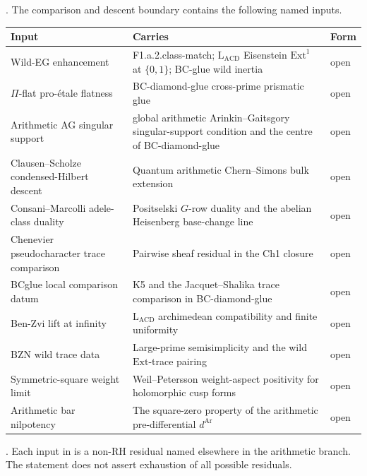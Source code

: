 \begin{definition}
\label{v4-arith:w10-final:def:prior-table}
\ClaimStatusDefinitional. The comparison and descent boundary contains
the following named inputs.
\begin{center}
\small
\begin{tabular}{p{3.6cm}p{7.8cm}p{1.4cm}}
\toprule
\textbf{Input} & \textbf{Carries} & \textbf{Form}\\
\midrule
Wild-EG enhancement &
F1.a.2.class-match;
\(\mathrm{L}_{\mathrm{ACD}}\) Eisenstein \(\mathrm{Ext}^{1}\) at
\(\{0,1\}\); BC-glue wild inertia &
\(\mathrm{open}\)\\
\(\Pi\)-flat pro-\'etale flatness &
BC-diamond-glue cross-prime prismatic glue &
\(\mathrm{open}\)\\
Arithmetic AG singular support &
global arithmetic Arinkin--Gaitsgory singular-support condition and
the centre of BC-diamond-glue &
\(\mathrm{open}\)\\
Clausen--Scholze condensed-Hilbert descent &
Quantum arithmetic Chern--Simons bulk extension &
\(\mathrm{open}\)\\
Consani--Marcolli adele-class duality &
Positselski \(G\)-row duality and the abelian Heisenberg base-change
line &
\(\mathrm{open}\)\\
Chenevier pseudocharacter trace comparison &
Pairwise sheaf residual in the Ch1 closure &
\(\mathrm{open}\)\\
BCglue local comparison datum &
K5 and the Jacquet--Shalika trace comparison in BC-diamond-glue &
\(\mathrm{open}\)\\
Ben-Zvi lift at infinity &
\(\mathrm{L}_{\mathrm{ACD}}\) archimedean compatibility and finite
uniformity &
\(\mathrm{open}\)\\
BZN wild trace data &
Large-prime semisimplicity and the wild \(\mathrm{Ext}\)-trace pairing &
\(\mathrm{open}\)\\
Symmetric-square weight limit &
Weil--Petersson weight-aspect positivity for holomorphic cusp forms &
\(\mathrm{open}\)\\
Arithmetic bar nilpotency &
The square-zero property of the arithmetic pre-differential
\(d^{\mathrm{Ar}}\) &
\(\mathrm{open}\)\\
\bottomrule
\end{tabular}
\end{center}
\end{definition}

\begin{theorem}
\label{v4-arith:w10-final:thm:four-prior}
\ClaimStatusProvedHere. Each input in
 is a non-RH residual named
elsewhere in the arithmetic branch. The statement does not assert
exhaustion of all possible residuals.
\end{theorem}

